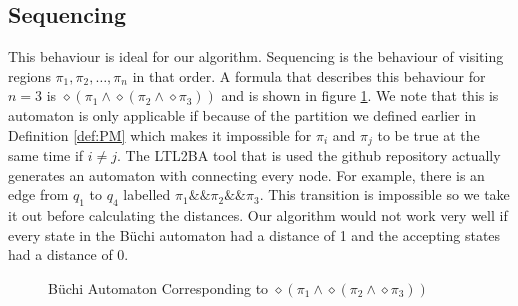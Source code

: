 \subsection{Sequencing}
This behaviour is ideal for our algorithm. Sequencing is the behaviour of visiting regions $\pi_1,\pi_2,\dots,\pi_n$ in that order. A formula that describes this behaviour for $n=3$ is $\diamond (\pi_1 \land \diamond(\pi_2 \land \diamond \pi_3))$ and is shown in figure \ref{fig:seq}. We note that this is automaton is only applicable if because of the partition we defined earlier in Definition \ref{def:PM} which makes it impossible for $\pi_i$ and $\pi_j$ to be true at the same time if $i\neq j$. The LTL2BA tool \cite{ltlbuchiwebsite} that is used the github repository \cite{pMasGit} actually generates an automaton with connecting every node. For example, there is an edge from $q_1$ to $q_4$ labelled $\pi_1 \&\& \pi_2 \&\& \pi_3$. This transition is impossible so we take it out before calculating the distances. Our algorithm would not work very well if every state in the B\"uchi automaton had a distance of 1 and the accepting states had a distance of 0.


\begin{figure}
\centering
{}
\caption{B\"uchi Automaton Corresponding to $\diamond (\pi_1 \land \diamond(\pi_2 \land \diamond \pi_3))$}
\label{fig:seq}
\end{figure}

